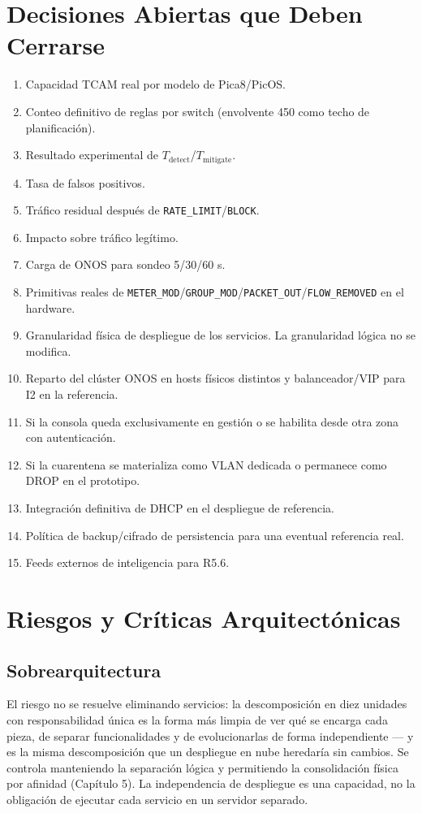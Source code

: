 \documentclass[11pt,a4paper]{report}
\begin{document}
\section{Decisiones Abiertas que Deben Cerrarse}
\begin{enumerate}
\item Capacidad TCAM real por modelo de Pica8/PicOS.
\item Conteo definitivo de reglas por switch (envolvente 450 como techo de planificación).
\item Resultado experimental de $T_{\text{detect}}$/$T_{\text{mitigate}}$.
\item Tasa de falsos positivos.
\item Tráfico residual después de \texttt{RATE\_LIMIT}/\texttt{BLOCK}.
\item Impacto sobre tráfico legítimo.
\item Carga de ONOS para sondeo 5/30/60 s.
\item Primitivas reales de \texttt{METER\_MOD}/\texttt{GROUP\_MOD}/\texttt{PACKET\_OUT}/\texttt{FLOW\_REMOVED} en el hardware.
\item Granularidad física de despliegue de los servicios. La granularidad lógica no se modifica.
\item Reparto del clúster ONOS en hosts físicos distintos y balanceador/VIP para I2 en la referencia.
\item Si la consola queda exclusivamente en gestión o se habilita desde otra zona con autenticación.
\item Si la cuarentena se materializa como VLAN dedicada o permanece como DROP en el prototipo.
\item Integración definitiva de DHCP en el despliegue de referencia.
\item Política de backup/cifrado de persistencia para una eventual referencia real.
\item Feeds externos de inteligencia para R5.6.
\end{enumerate}

\section{Riesgos y Críticas Arquitectónicas}

\subsection{Sobrearquitectura}
El riesgo no se resuelve eliminando servicios: la descomposición en diez unidades con responsabilidad única es la forma más limpia de ver qué se encarga cada pieza, de separar funcionalidades y de evolucionarlas de forma independiente — y es la misma descomposición que un despliegue en nube heredaría sin cambios. Se controla manteniendo la separación lógica y permitiendo la consolidación física por afinidad (Capítulo 5). La independencia de despliegue es una capacidad, no la obligación de ejecutar cada servicio en un servidor separado.
\end{document}
